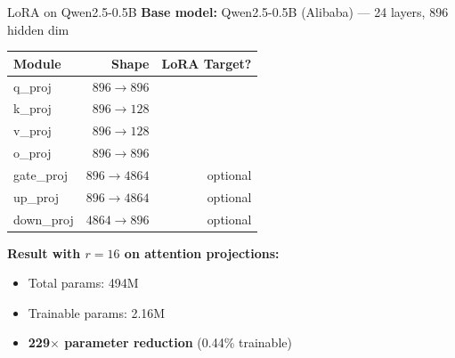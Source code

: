 \documentclass[aspectratio=169,10pt]{beamer}
\begin{document}
\begin{frame}{LoRA on Qwen2.5-0.5B}
	\textbf{Base model:} Qwen2.5-0.5B (Alibaba) --- 24 layers, 896 hidden dim

	\vspace{0.3cm}
	\begin{table}
		\centering
		\small
		\begin{tabular}{lrr}
			\toprule
			\textbf{Module} & \textbf{Shape} & \textbf{LoRA Target?} \\
			\midrule
			q\_proj         & $896 \to 896$  & \checkmark            \\
			k\_proj         & $896 \to 128$  & \checkmark            \\
			v\_proj         & $896 \to 128$  & \checkmark            \\
			o\_proj         & $896 \to 896$  & \checkmark            \\
			gate\_proj      & $896 \to 4864$ & optional              \\
			up\_proj        & $896 \to 4864$ & optional              \\
			down\_proj      & $4864 \to 896$ & optional              \\
			\bottomrule
		\end{tabular}
	\end{table}

	\vspace{0.2cm}
	\textbf{Result with $r=16$ on attention projections:}
	\begin{itemize}
		\item Total params: 494M
		\item Trainable params: 2.16M
		\item \textbf{229$\times$ parameter reduction} (0.44\% trainable)
	\end{itemize}
\end{frame}
\end{document}
